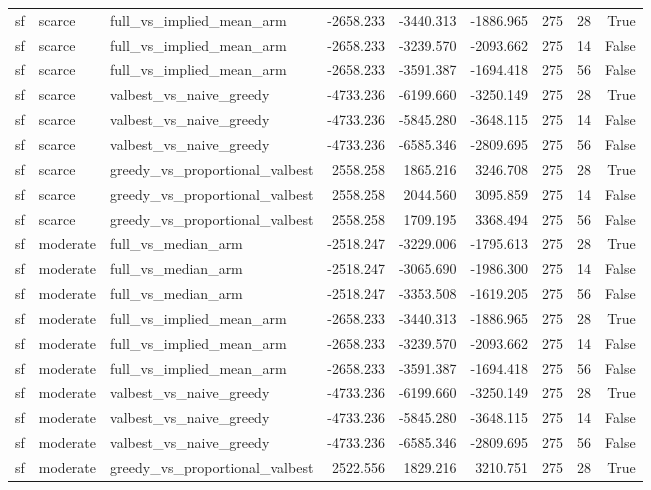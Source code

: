 \begin{tabular}{lllrrrrrr}
sf & scarce & full\_vs\_implied\_mean\_arm & -2658.233 & -3440.313 & -1886.965 & 275 & 28 & True \\
sf & scarce & full\_vs\_implied\_mean\_arm & -2658.233 & -3239.570 & -2093.662 & 275 & 14 & False \\
sf & scarce & full\_vs\_implied\_mean\_arm & -2658.233 & -3591.387 & -1694.418 & 275 & 56 & False \\
sf & scarce & valbest\_vs\_naive\_greedy & -4733.236 & -6199.660 & -3250.149 & 275 & 28 & True \\
sf & scarce & valbest\_vs\_naive\_greedy & -4733.236 & -5845.280 & -3648.115 & 275 & 14 & False \\
sf & scarce & valbest\_vs\_naive\_greedy & -4733.236 & -6585.346 & -2809.695 & 275 & 56 & False \\
sf & scarce & greedy\_vs\_proportional\_valbest & 2558.258 & 1865.216 & 3246.708 & 275 & 28 & True \\
sf & scarce & greedy\_vs\_proportional\_valbest & 2558.258 & 2044.560 & 3095.859 & 275 & 14 & False \\
sf & scarce & greedy\_vs\_proportional\_valbest & 2558.258 & 1709.195 & 3368.494 & 275 & 56 & False \\
sf & moderate & full\_vs\_median\_arm & -2518.247 & -3229.006 & -1795.613 & 275 & 28 & True \\
sf & moderate & full\_vs\_median\_arm & -2518.247 & -3065.690 & -1986.300 & 275 & 14 & False \\
sf & moderate & full\_vs\_median\_arm & -2518.247 & -3353.508 & -1619.205 & 275 & 56 & False \\
sf & moderate & full\_vs\_implied\_mean\_arm & -2658.233 & -3440.313 & -1886.965 & 275 & 28 & True \\
sf & moderate & full\_vs\_implied\_mean\_arm & -2658.233 & -3239.570 & -2093.662 & 275 & 14 & False \\
sf & moderate & full\_vs\_implied\_mean\_arm & -2658.233 & -3591.387 & -1694.418 & 275 & 56 & False \\
sf & moderate & valbest\_vs\_naive\_greedy & -4733.236 & -6199.660 & -3250.149 & 275 & 28 & True \\
sf & moderate & valbest\_vs\_naive\_greedy & -4733.236 & -5845.280 & -3648.115 & 275 & 14 & False \\
sf & moderate & valbest\_vs\_naive\_greedy & -4733.236 & -6585.346 & -2809.695 & 275 & 56 & False \\
sf & moderate & greedy\_vs\_proportional\_valbest & 2522.556 & 1829.216 & 3210.751 & 275 & 28 & True \\

\end{tabular}
